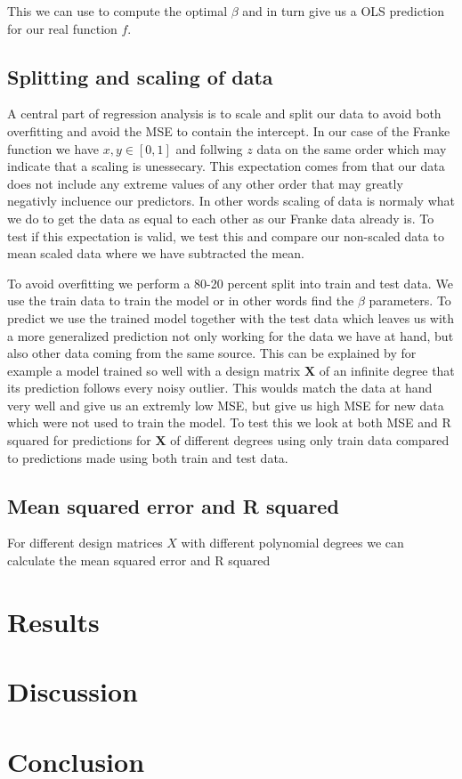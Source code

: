 \documentclass[norsk,a4paper,11pt]{scrartcl}
\begin{document}
This we can use to compute the optimal $\beta$ and in turn give us a OLS prediction for our real function $f$.

\subsection{Splitting and scaling of data}
A central part of regression analysis is to scale and split our data to avoid both overfitting and avoid the MSE to contain the intercept. In our case of the Franke function we have $x,y \in [0,1]$ and follwing $z$ data on the same order which may indicate that a scaling is unessecary. This expectation comes from that our data does not include any extreme values of any other order that may greatly negativly incluence our predictors. In other words scaling of data is normaly what we do to get the data as equal to each other as our Franke data already is. To test if this expectation is valid, we test this and compare our non-scaled data to mean scaled data where we have subtracted the mean.

To avoid overfitting we perform a 80-20 percent split into train and test data. We use the train data to train the model or in other words find the $\beta$ parameters. To predict we use the trained model together with the test data which leaves us with a more generalized prediction not only working for the data we have at hand, but also other data coming from the same source. This can be explained by for example a model trained so well with a design matrix $\boldsymbol{X}$ of an infinite degree that its prediction follows every noisy outlier. This woulds match the data at hand very well and give us an extremly low MSE, but give us high MSE for new data which were not used to train the model. To test this we look at both MSE and R squared for predictions for $\boldsymbol{X}$ of different degrees using only train data compared to predictions made using both train and test data.

\subsection{Mean squared error and R squared}
For different design matrices $X$ with different polynomial degrees we can calculate the mean squared error and R squared

\section{Results}
\section{Discussion}
\section{Conclusion}

\section{}
\end{document}
